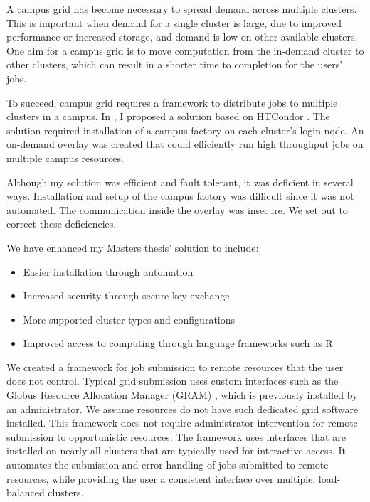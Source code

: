 A campus grid has become necessary to spread demand across multiple clusters.  This is important when demand for a single cluster is large, due to improved performance or increased storage, and demand is low on other available clusters.  One aim for a campus grid is to move computation from the in-demand cluster to other clusters, which can result in a shorter time to completion for the users' jobs.

To succeed, campus grid requires a framework to distribute jobs to multiple clusters in a campus.  In \cite{weitzel2011campus}, I proposed a solution based on HTCondor \cite{litzkow1988condor}.  The solution required installation of a campus factory \cite{website:campusfactory} on each cluster's login node.  An on-demand overlay was created that could efficiently run high throughput jobs on multiple campus resources.  

Although my solution was efficient and fault tolerant, it was deficient in several ways.  Installation and setup of the campus factory was difficult since it was not automated.  The communication inside the overlay was insecure.  We set out to correct these deficiencies.


We have enhanced my Masters thesis' solution to include:
\begin{itemize}
\item Easier installation through automation
\item Increased security through secure key exchange
\item More supported cluster types and configurations
\item Improved access to computing through language frameworks such as R \cite{team2005r}
\end{itemize}

We created a framework for job submission to remote resources that the user does not control.  Typical grid submission uses custom interfaces such as the Globus Resource Allocation Manager (GRAM) \cite{foster1999globus}, which is previously installed by an administrator.  We assume resources do not have such dedicated grid software installed.  This framework does not require administrator intervention for remote submission to opportunistic resources.  The framework uses interfaces that are installed on nearly all clusters that are typically used for interactive access.  It automates the submission and error handling of jobs submitted to remote resources, while providing the user a consistent interface over multiple, load-balanced clusters.

